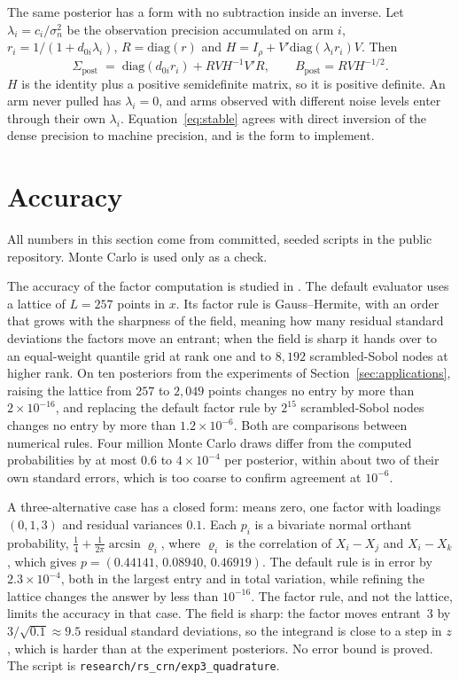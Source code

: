\documentclass[11pt]{article}
\begin{document}
The same posterior has a form with no subtraction inside an inverse.
Let $\lambda_i = c_i / \sigma_n^2$ be the observation precision
accumulated on arm $i$, $r_i = 1/(1 + d_{0i} \lambda_i)$,
$R = \mathrm{diag}(r)$ and $H = I_\rho + V' \mathrm{diag}(\lambda_i
r_i) V$. Then
\begin{equation}
\Sigma_{\text{post}} \;=\; \mathrm{diag}(d_{0i} r_i) + R V H^{-1} V' R,
\qquad B_{\text{post}} = R V H^{-1/2}.
\label{eq:stable}
\end{equation}
$H$ is the identity plus a positive semidefinite matrix, so it is
positive definite. An arm never pulled has $\lambda_i = 0$, and arms
observed with different noise levels enter through their own
$\lambda_i$. Equation~\eqref{eq:stable} agrees with direct inversion
of the dense precision to machine precision, and is the form to
implement.

\section{Accuracy}
\label{sec:checks}

All numbers in this section come from committed, seeded scripts in
the public repository. Monte Carlo is used only as a check.

The accuracy of the factor computation is
studied in \citet{cotton2026}. The default evaluator uses a lattice of
$L=257$ points in $x$. Its factor rule is Gauss--Hermite, with an
order that grows with the sharpness of the field, meaning how many
residual standard deviations the factors move an entrant; when the
field is sharp it hands over to an equal-weight quantile grid at rank
one and to $8{,}192$ scrambled-Sobol nodes at higher rank. On ten posteriors from the experiments
of Section~\ref{sec:applications}, raising the lattice from $257$ to
$2{,}049$ points changes no entry by more than $2 \times 10^{-16}$,
and replacing the default factor rule by $2^{15}$ scrambled-Sobol
nodes changes no entry by more than $1.2 \times 10^{-6}$. Both are
comparisons between numerical rules. Four million Monte Carlo draws
differ from the computed probabilities by at most $0.6$ to
$4 \times 10^{-4}$ per posterior, within about two of their own
standard errors, which is too coarse to confirm agreement at
$10^{-6}$.

A three-alternative case has a closed form: means zero, one factor
with loadings $(0,1,3)$ and residual variances $0.1$. Each $p_i$ is a
bivariate normal orthant probability,
$\tfrac14+\tfrac1{2\pi}\arcsin\varrho_i$, where $\varrho_i$ is the
correlation of $X_i-X_j$ and $X_i-X_k$, which gives
$p=(0.44141,\,0.08940,\,0.46919)$. The default rule is in error by
$2.3 \times 10^{-4}$, both in the largest entry and in total
variation, while refining the lattice changes the answer by less than
$10^{-16}$. The factor rule, and not the lattice, limits the accuracy
in that case. The field is sharp: the factor moves entrant~3 by
$3/\sqrt{0.1}\approx9.5$ residual standard deviations, so the
integrand is close to a step in $z$, which is harder than at the
experiment posteriors. No error
bound is proved. The script is
\texttt{research/rs\_crn/exp3\_quadrature}.
\end{document}
